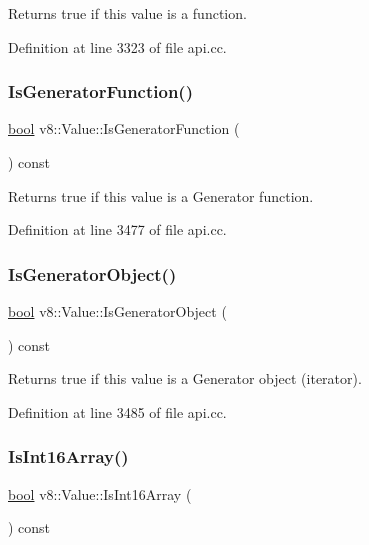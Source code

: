 Returns true if this value is a function. 

Definition at line 3323 of file api.\+cc.

\mbox{\label{classv8_1_1Value_ac0a7fcb3b244a921e5574e6f34fa9b07}} 
\subsubsection{\texorpdfstring{Is\+Generator\+Function()}{IsGeneratorFunction()}}
{\footnotesize\ttfamily \mbox{\hyperlink{classbool}{bool}} v8\+::\+Value\+::\+Is\+Generator\+Function (\begin{DoxyParamCaption}{ }\end{DoxyParamCaption}) const}

Returns true if this value is a Generator function. 

Definition at line 3477 of file api.\+cc.

\mbox{\label{classv8_1_1Value_af6f2d3199fe8b5eee219ef42574293ac}} 
\subsubsection{\texorpdfstring{Is\+Generator\+Object()}{IsGeneratorObject()}}
{\footnotesize\ttfamily \mbox{\hyperlink{classbool}{bool}} v8\+::\+Value\+::\+Is\+Generator\+Object (\begin{DoxyParamCaption}{ }\end{DoxyParamCaption}) const}

Returns true if this value is a Generator object (iterator). 

Definition at line 3485 of file api.\+cc.

\mbox{\label{classv8_1_1Value_a8db779f4ac104540e63d78e73d424195}} 
\subsubsection{\texorpdfstring{Is\+Int16\+Array()}{IsInt16Array()}}
{\footnotesize\ttfamily \mbox{\hyperlink{classbool}{bool}} v8\+::\+Value\+::\+Is\+Int16\+Array (\begin{DoxyParamCaption}{ }\end{DoxyParamCaption}) const}

